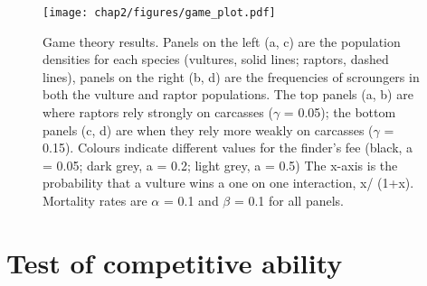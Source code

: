 \begin{figure}[H] %
	  \centering
	  \texttt{[image: chap2/figures/game\_plot.pdf]}
	    \caption[Game theory plot] %
	    {Game theory results. Panels on the left (a, c) are the population densities for each species (vultures, solid lines; raptors, dashed lines), panels on the right (b, d) are the frequencies of scroungers in both the vulture and raptor populations. The top panels (a, b) are where raptors rely strongly on carcasses ($\gamma$ = 0.05); the bottom panels (c, d) are when they rely more weakly on carcasses ($\gamma$ = 0.15). Colours indicate different values for the finder's fee (black, a = 0.05; dark grey, a = 0.2; light grey, a = 0.5) The x-axis is the probability that a vulture wins a one on one interaction, x/ (1+x).  Mortality rates are $\alpha$ = 0.1 and $\beta$ = 0.1 for all panels.}%
	  \label{fig:game_plot}
	\end{figure}
	

\section{\uppercase{T}est of competitive ability}

